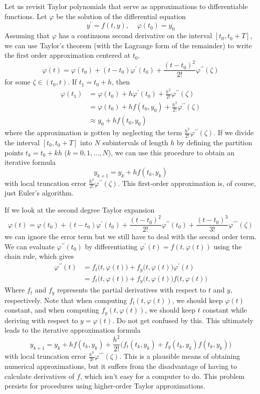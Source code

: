 \documentclass{article}
\theoremstyle{remark}
\theoremstyle{definition}
\begin{document}
    Let us revisit Taylor polynomials that serve as approximations to differentiable functions. Let $\varphi$ be the solution of the differential equation 
    \[y^\prime = f(t, y) , \;\;\;\; \varphi(t_0) = y_0\]
    Assuming that $\varphi$ has a continuous second derivative on the interval $[t_0, t_0 + T]$, we can use Taylor's theorem (with the Lagrange form of the remainder) to write the first order approximation centered at $t_0$.  
    \[\varphi(t) = \varphi(t_0) + (t - t_0) \varphi^\prime (t_0) + \frac{(t - t_0)^2}{2!} \varphi^{\prime\prime} (\zeta)\]
    for some $\zeta \in (t_0, t)$. If $t_1 = t_0 + h$, then
    \begin{align*}
        \varphi(t_1) & = \varphi(t_0) + h \varphi^\prime (t_0) + \frac{h^2}{2!} \varphi^{\prime\prime} (\zeta) \\
        & = \varphi(t_0) + h f(t_0, y_0) + \frac{h^2}{2!} \varphi^{\prime\prime} (\zeta) \\
        & \approx y_0 + h f(t_0, y_0)
    \end{align*}
    where the approximation is gotten by neglecting the term $\frac{h^2}{2!} \varphi^{\prime\prime} (\zeta)$. If we divide the interval $[t_0, t_0 + T]$ into $N$ subintervals of length $h$ by defining the partition points $t_k = t_0 + kh$ ($k = 0, 1, \ldots, N$), we can use this procedure to obtain an iterative formula
    \[y_{k+1} = y_k + hf(t_k, y_k)\]
    with local truncation error $\frac{h^2}{2!} \varphi^{\prime\prime} (\zeta)$. This first-order approximation is, of course, just Euler's algorithm. 

    If we look at the second degree Taylor expansion 
    \[\varphi(t) = \varphi(t_0) + (t - t_0) \varphi^\prime (t_0) + \frac{(t - t_0)^2}{2!} \varphi^{\prime\prime} (t_0) + \frac{(t - t_0)^3}{3!} \varphi^{\prime\prime\prime} (\zeta)\]
    we can ignore the error term but we still have to deal with the second order term. We can evaluate $\varphi^{\prime\prime} (t_0)$ by differentiating $\varphi^\prime (t) = f(t, \varphi(t))$ using the chain rule, which gives
    \begin{align*}
        \varphi^{\prime\prime} (t) & = f_t \big( t, \varphi(t)\big) + f_y \big(t, \varphi(t)\big) \varphi^\prime (t) \\
        & = f_t \big(t, \varphi(t)\big) + f_y \big( t, \varphi(t)\big) f\big(t, \varphi(t)\big)
    \end{align*}
    Where $f_t$ and $f_y$ represents the partial derivatives with respect to $t$ and $y$, respectively. Note that when computing $f_t (t, \varphi(t))$, we should keep $\varphi(t)$ constant, and when computing $f_y (t, \varphi(t))$, we should keep $t$ constant while deriving with respect to $y = \varphi(t)$. Do not get confused by this. This ultimately leads to the iterative approximation formula
    \[y_{k+1} = y_k + h f(t_k, y_k) + \frac{h^2}{2!} \big( f_t (t_k, y_k) + f_y (t_k, y_k) f(t_k, y_k)\big)\]
    with local truncation error $\frac{h^3}{3!} \varphi^{\prime\prime\prime} (\zeta)$. This is a plausible means of obtaining numerical approximations, but it suffers from the disadvantage of having to calculate derivatives of $f$, which isn't easy for a computer to do. This problem persists for procedures using higher-order Taylor approximations. 
\end{document}
